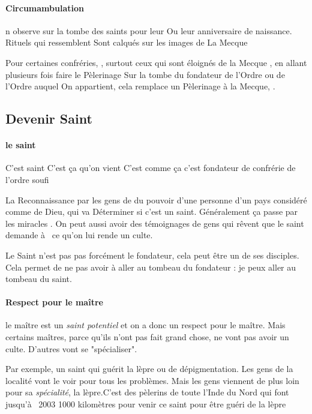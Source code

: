 \paragraph{Circumambulation} n observe sur la tombe des saints pour leur 
Ou leur anniversaire de naissance. Rituels qui  ressemblent 
Sont calqués sur les images de La Mecque 
  
Pour certaines 
confréries,  , surtout ceux qui  sont éloignés 
de la Mecque 
, en 
allant plusieurs fois faire le 
Pèlerinage 
Sur la tombe du fondateur de l'Ordre ou de l'Ordre auquel 
On appartient, cela remplace un 
Pèlerinage 
à  la Mecque,  . 

\subsection{Devenir Saint}

\paragraph{le saint} 
C'est saint  C'est ça qu'on vient 
C'est comme ça   c'est fondateur 
de confrérie 
de l'ordre soufi 

La Reconnaissance par les gens de du pouvoir d'une personne d'un pays considéré comme de Dieu, qui  va 
Déterminer si c'est un saint. Généralement ça passe par les miracles    . On peut aussi avoir des témoignages 
de gens qui  rêvent que le saint demande à  ce qu'on lui rende un culte.

Le Saint n'est pas pas forcément le fondateur, cela peut être un de ses disciples. Cela permet de ne pas avoir à aller au tombeau du fondateur : je peux aller au tombeau du saint. 



\paragraph{Respect pour le maître} le maître est un \textit{saint potentiel} et on a donc un respect pour le maître. Mais certains maîtres, parce qu'ils n'ont pas fait grand chose, ne vont pas avoir un culte. D'autres vont se "spécialiser". 
\begin{Ex}
    Par exemple, un saint qui guérit la lèpre ou de dépigmentation. Les gens de la localité vont le voir pour tous les problèmes. Mais les gens viennent de plus loin pour sa \textit{spécialité}, la lèpre.C'est des pèlerins 
de toute l'Inde du Nord qui  font jusqu'à  
2003 1000 kilomètres pour venir ce saint pour être guéri 
de la lèpre 

\end{Ex}

